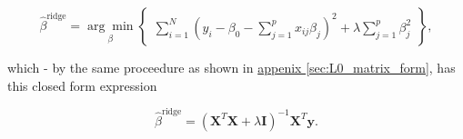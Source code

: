 \documentclass[../main.tex]{subfiles}
\begin{document}
\begin{equation*}
  \hat \beta^{\text{ridge}} = \underset{\beta}{\arg \min} \begin{Bmatrix}\sum_{i=1}^N\left(y_i - \beta_0 - \sum_{j=1}^p x_{ij}\beta_j\right)^2 + \lambda \sum_{j=1}^p \beta_j^2 \end{Bmatrix},
\end{equation*}

which - by the same proceedure as shown in \hyperref[sec:L0_matrix_form]{appenix \ref*{sec:L0_matrix_form}}, has this closed form expression

\begin{equation}
  \hat \beta^{\text{ridge}} = (\mathbf X^T\mathbf X + \lambda \mathbf I)^{-1}\mathbf X^T\mathbf y.
\end{equation}
\end{document}
